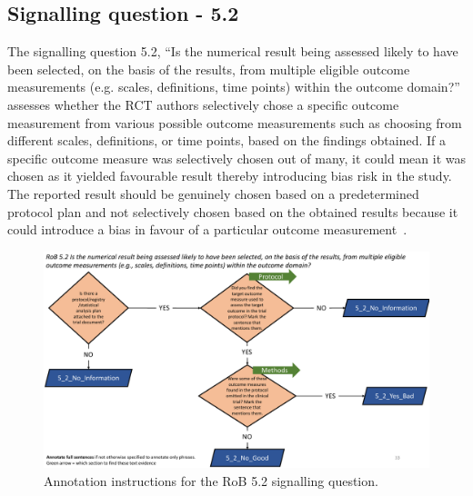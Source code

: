 \documentclass[sn-mathphys,Numbered]{sn-jnl}%
\begin{document}
\subsection*{Signalling question - 5.2}
\label{subsec:5_2}
%
The signalling question 5.2, ``Is the numerical result being assessed likely to have been selected, on the basis of the results, from multiple eligible outcome measurements (e.g. scales, definitions, time points) within the outcome domain?'' assesses whether the RCT authors selectively chose a specific outcome measurement from various possible outcome measurements such as choosing from different scales, definitions, or time points, based on the findings obtained.
If a specific outcome measure was selectively chosen out of many, it could mean it was chosen as it yielded favourable result thereby introducing bias risk in the study.
The reported result should be genuinely chosen based on a predetermined protocol plan and not selectively chosen based on the obtained results because it could introduce a bias in favour of a particular outcome measurement~\cite{rankin2017selective,bouter2021research}.


%
%
%
\begin{figure}[htbp]
    \centering
    \includegraphics[width=\textwidth]{figures/5_2.pdf}
    \caption{Annotation instructions for the RoB 5.2 signalling question.}
    \label{fig:5_2}
\end{figure}
%
%
%
\end{document}
